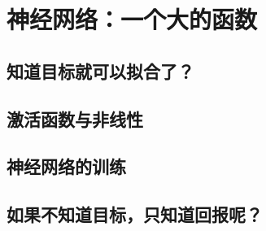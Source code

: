 \section{神经网络：一个大的函数}
\subsection{知道目标就可以拟合了？}
\subsection{激活函数与非线性}
\subsection{神经网络的训练}
\subsection{如果不知道目标，只知道回报呢？}